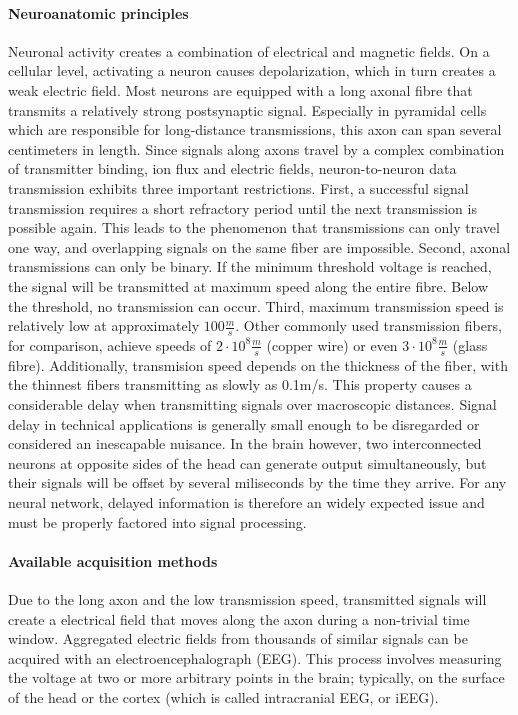 \paragraph{Neuroanatomic principles}
Neuronal activity creates a combination of electrical and magnetic fields.
On a cellular level, activating a neuron causes depolarization, which in turn creates a weak electric field.
Most neurons are equipped with a long axonal fibre that transmits a relatively strong postsynaptic signal.
Especially in pyramidal cells which are responsible for long-distance transmissions, this axon can span several centimeters in length.
Since signals along axons travel by a complex combination of transmitter binding, ion flux and electric fields, neuron-to-neuron data transmission exhibits three important restrictions.
First, a successful signal transmission requires a short refractory period until the next transmission is possible again.
This leads to the phenomenon that transmissions can only travel one way, and overlapping signals on the same fiber are impossible.
Second, axonal transmissions can only be binary.
If the minimum threshold voltage is reached, the signal will be transmitted at maximum speed along the entire fibre.
Below the threshold, no transmission can occur.
Third, maximum transmission speed is relatively low at approximately $100\frac{m}{s}$.
Other commonly used transmission fibers, for comparison, achieve speeds of $2\cdot10^8\frac{m}{s}$ (copper wire) or even $3\cdot10^8\frac{m}{s}$ (glass fibre).
Additionally, transmision speed depends on the thickness of the fiber, with the thinnest fibers transmitting as slowly as 0.1m/s.
This property causes a considerable delay when transmitting signals over macroscopic distances.
Signal delay in technical applications is generally small enough to be disregarded or considered an inescapable nuisance.
In the brain however, two interconnected neurons at opposite sides of the head can generate output simultaneously, but their signals will be offset by several miliseconds by the time they arrive.
For any neural network, delayed information is therefore an widely expected issue and must be properly factored into signal processing.

\paragraph {Available acquisition methods}
Due to the long axon and the low transmission speed, transmitted signals will create a electrical field that moves along the axon during a non-trivial time window.
Aggregated electric fields from thousands of similar signals can be acquired with an electroencephalograph (EEG).
This process involves measuring the voltage at two or more arbitrary points in the brain; typically, on the surface of the head or the cortex (which is called intracranial EEG, or iEEG).

